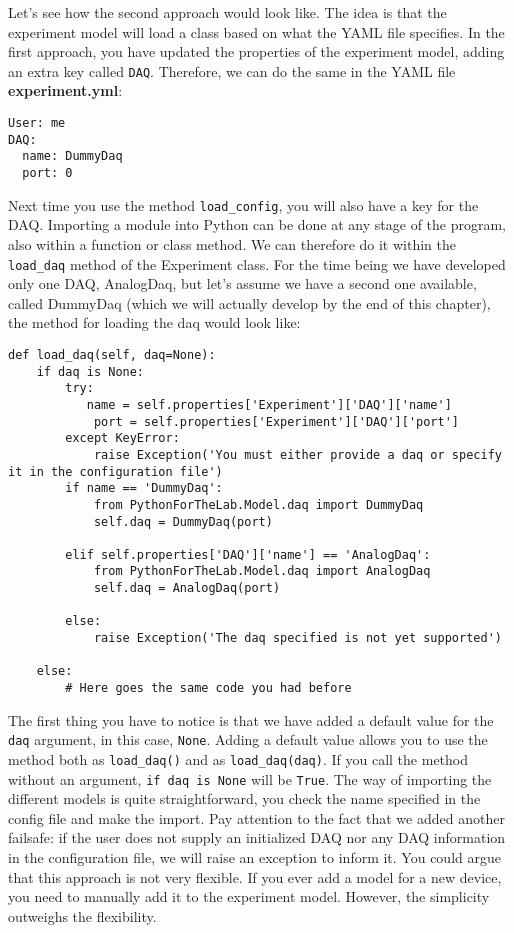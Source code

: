 {Let's see how the second approach would look like. The idea is that the experiment model will load a class based on what the {YAML} file specifies. In the first approach, you have updated the properties of the
experiment model, adding an extra key called \texttt{DAQ}. Therefore, we can do the same in the {YAML} file \textbf{experiment.yml}:

\begin{verbatim}
User: me
DAQ:
  name: DummyDaq
  port: 0
\end{verbatim}

Next time you use the method \texttt{load_config}, you will also have a key for the {DAQ}. Importing a module into Python can be done at any stage of the program, also within a function or class method. We can therefore do it within the \texttt{load_daq} method of the Experiment class. For the time being we have developed only one DAQ, AnalogDaq, but let's assume we have a second one available, called DummyDaq (which we will actually develop by the end of this chapter), the method for loading the daq would look like:

\begin{verbatim}
def load_daq(self, daq=None):
    if daq is None:
        try:
           name = self.properties['Experiment']['DAQ']['name']
            port = self.properties['Experiment']['DAQ']['port']
        except KeyError:
            raise Exception('You must either provide a daq or specify it in the configuration file')
        if name == 'DummyDaq':
            from PythonForTheLab.Model.daq import DummyDaq
            self.daq = DummyDaq(port)
        
        elif self.properties['DAQ']['name'] == 'AnalogDaq':
            from PythonForTheLab.Model.daq import AnalogDaq
            self.daq = AnalogDaq(port)
        
        else:
            raise Exception('The daq specified is not yet supported')
    
    else:
        # Here goes the same code you had before
\end{verbatim}

The first thing you have to notice is that we have added a default value for the \texttt{daq} argument, in this case, \texttt{None}. Adding a default value allows you to use the
method both as \texttt{load_daq()} and as \texttt{load_daq(daq)}. If you call the method without an argument, \texttt{if daq is None} will be \texttt{True}. The way of importing the different models is quite straightforward, you check the name specified in the config file and make the import. Pay attention to the fact that we added another failsafe: if the user does not supply an initialized DAQ nor any DAQ information in the configuration file, we will raise an exception to inform it. You could argue that this approach is not very flexible. If you ever add a model for a new device, you need to manually add it to the experiment model. However, the simplicity outweighs the flexibility. 

}
